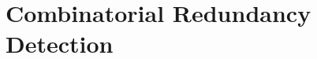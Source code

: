 \section{Combinatorial Redundancy Detection}
\begin{frame}\frametitle{\insertsection}\justifying

\end{frame}